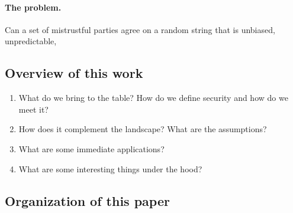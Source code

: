 







\paragraph{The problem.} 
Can a set of mistrustful parties agree on a random string that is unbiased, unpredictable, 

\subsection{Overview of this work}
\begin{enumerate}
    \item What do we bring to the table? How do we define security and how do we meet it?
    \item How does it complement the landscape? What are the assumptions?
    \item What are some immediate applications?
    \item What are some interesting things under the hood?
\end{enumerate}




\subsection{Organization of this paper}